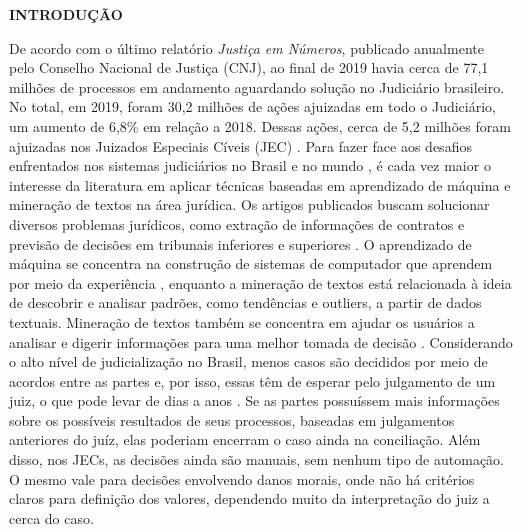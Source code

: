 

\setlength{\absparsep}{18pt} %
\begin{resumo}
	\SingleSpacing
	
\textbf{\textsf{INTRODUÇÃO}}


De acordo com o último relatório \textit{Justiça em Números}, publicado anualmente pelo Conselho Nacional de Justiça (CNJ), ao final de 2019 havia cerca de 77,1 milhões de processos em andamento aguardando solução no Judiciário brasileiro. No total, em 2019, foram 30,2 milhões de ações ajuizadas em todo o Judiciário, um aumento de 6,8\% em relação a 2018. Dessas ações, cerca de 5,2 milhões foram ajuizadas nos Juizados Especiais Cíveis (JEC) \cite{CNJ2020}.  Para fazer face aos desafios enfrentados nos sistemas judiciários no Brasil e no mundo \cite{Sadiku2020}, é cada vez maior o interesse da literatura em aplicar técnicas baseadas em aprendizado de máquina e mineração de textos na área jurídica. Os artigos publicados buscam solucionar diversos problemas jurídicos, como extração de informações de contratos \cite{Hassan2020} e previsão de decisões em tribunais inferiores e superiores \cite{Sulea2017, Virtucio2018}. O aprendizado de máquina se concentra na construção de sistemas de computador que aprendem por meio da experiência \cite{Mitchell1997}, enquanto a mineração de textos está relacionada à ideia de descobrir e analisar padrões, como tendências e outliers, a partir de dados textuais. Mineração de textos também se concentra em ajudar os usuários a analisar e digerir informações para uma melhor tomada de decisão \cite{Aggarwal2013}. 
Considerando o alto nível de judicialização no Brasil, menos casos são decididos por meio de acordos entre as partes e, por isso, essas têm de esperar pelo julgamento de um juiz, o que pode levar de dias a anos \cite{Cury2019, Mancuso2020}.
Se as partes possuíssem mais informações sobre os possíveis resultados de seus processos, baseadas em julgamentos anteriores do juíz, elas poderiam encerram o caso ainda na conciliação. Além disso, nos JECs, as decisões ainda são manuais, sem nenhum tipo de automação. O mesmo vale para decisões envolvendo danos morais, onde não há critérios claros para definição dos valores, dependendo muito da interpretação do juiz a cerca do caso.

\end{resumo}
